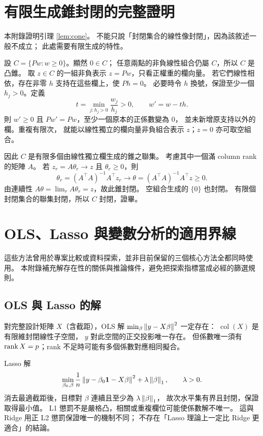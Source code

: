 \appendix
\section{有限生成錐封閉的完整證明}\label{app:cone}

本附錄證明引理 \ref{lem:cone}。
不能只說「封閉集合的線性像封閉」，因為該敘述一般不成立；
此處需要有限生成的特性。

設 $C=\{Pw:w\ge0\}$。顯然 $0\in C$；
任意兩點的非負線性組合仍屬 $C$，所以 $C$ 是凸錐。
取 $z\in C$ 的一組非負表示 $z=Pw$，只看正權重的欄向量。
若它們線性相依，存在非零 $h$ 支持在這些欄上，使 $Ph=0$。
必要時令 $h$ 換號，保證至少一個 $h_j>0$。定義
\begin{equation}
t=\min_{j:h_j>0}\frac{w_j}{h_j}>0,\qquad w'=w-th.
\end{equation}
則 $w'\ge0$ 且 $Pw'=Pw$，至少一個原本的正係數變為 0，
並未新增原支持以外的欄。重複有限次，
就能以線性獨立的欄向量非負組合表示 $z$；$z=0$ 亦可取空組合。

因此 $C$ 是有限多個由線性獨立欄生成的錐之聯集。
考慮其中一個滿 column rank 的矩陣 $A$。
若 $z_r=A\theta_r\to z$ 且 $\theta_r\ge0$，則
\begin{equation}
\theta_r=(A^\top A)^{-1}A^\top z_r
\longrightarrow\theta=(A^\top A)^{-1}A^\top z\ge0.
\end{equation}
由連續性 $A\theta=\lim_rA\theta_r=z$，故此錐封閉。
空組合生成的 $\{0\}$ 也封閉。
有限個封閉集合的聯集封閉，所以 $C$ 封閉，證畢。

\section{OLS、Lasso 與變數分析的適用界線}

這些方法曾用於專案比較或資料探索，並非目前保留的三個核心方法全都同時使用。
本附錄補充解存在性的關係與推論條件，避免把探索指標當成必經的篩選規則。

\subsection{OLS 與 Lasso 的解}
對完整設計矩陣 $X$（含截距），OLS 解
$\min_\beta\left\lVert y-X\beta\right\rVert^2$ 一定存在：
$\operatorname{col}(X)$ 是有限維封閉線性子空間，
$y$ 對此空間的正交投影唯一存在。
但係數唯一須有 $\operatorname{rank} X=p$；rank 不足時可能有多個係數對應相同擬合。

Lasso \cite{lasso} 解
\[
\min_{\beta_0,\beta}\frac1n\left\lVert y-\beta_0\mathbf 1-X\beta\right\rVert^2
+\lambda\left\lVert\beta\right\rVert_1,\qquad\lambda>0.
\]
消去最適截距後，目標對 $\beta$ 連續且至少為 $\lambda\left\lVert\beta\right\rVert_1$，
故次水平集有界且封閉，保證取得最小值。
L1 懲罰不是嚴格凸，相關或重複欄位可能使係數解不唯一。
這與 Ridge 用正 L2 懲罰保證唯一的機制不同；
不存在「Lasso 理論上一定比 Ridge 更適合」的結論。

